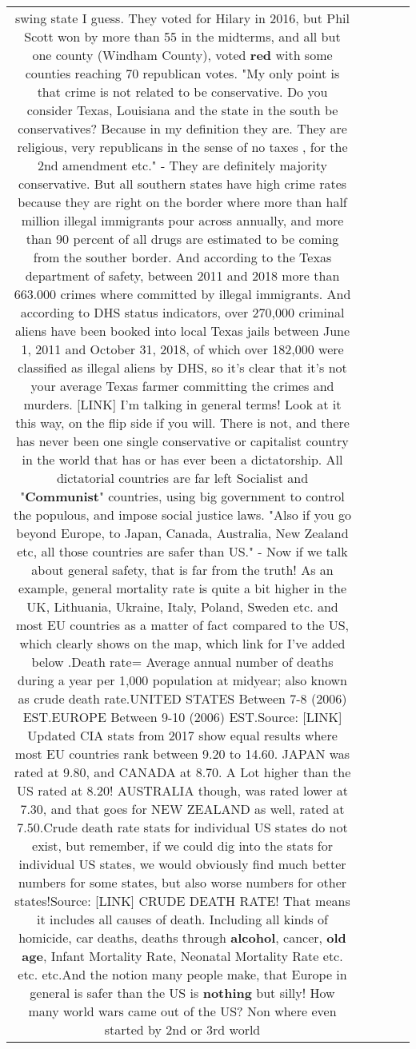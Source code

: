 \documentclass[11pt]{article}
\newlength\mylength
\begin{document}
\begin{center}
\begin{longtable}{|C{.65\mylength}|C{.30\mylength}|C{.12\mylength}|C{.12\mylength}|C{.12\mylength}|}
swing state I guess. They voted for Hilary in 2016, but Phil Scott won by more than 55 in the midterms, and all but one county (Windham County), voted \textbf{r\textbf{ed}} with some counties reaching 70 republican votes. "My only point is that crime is not related to be conservative. Do you consider Texas, Louisiana and the state in the south be conservatives? Because in my definition they are. They are religious, very republicans in the sense of no taxes , for the 2nd amendment etc." - They are definitely majority conservative. But all southern states have high crime rates because they are right on the border where more than half million illegal immigrants pour across annually, and more than 90 percent of all drugs are estimated to be coming from the souther border. And according to the Texas department of safety, between 2011 and 2018 more than 663.000 crimes where committed by illegal immigrants. And according to DHS status indicators, over 270,000 criminal aliens have been booked into local Texas jails between June 1, 2011 and October 31, 2018, of which over 182,000 were classified as illegal aliens by DHS, so it's clear that it's not your average Texas farmer committing the crimes and murders. [LINK] I'm talking in general terms! Look at it this way, on the flip side if you will. There is not, and there has never been one single conservative or capitalist country in the world that has or has ever been a dictatorship. All dictatorial countries are far left Socialist and "\textbf{Communist}" countries, using big government to control the populous, and impose social justice laws. "Also if you go beyond Europe, to Japan, Canada, Australia, New Zealand etc, all those countries are safer than US." - Now if we talk about general safety, that is far from the truth! As an example, general mortality rate is quite a bit higher in the UK, Lithuania, Ukraine, Italy, Poland, Sweden etc. and most EU countries as a matter of fact compared to the US, which clearly shows on the map, which link for I've added below .Death rate= Average annual number of deaths during a year per 1,000 population at midyear; also known as crude death rate.UNITED STATES     Between 7-8     (2006) EST.EUROPE       Between 9-10   (2006) EST.Source:   [LINK]  Updated CIA stats from 2017 show equal results where most EU countries rank between 9.20 to 14.60. JAPAN was rated at 9.80, and CANADA at 8.70. A Lot higher than the US rated at 8.20! AUSTRALIA though, was rated lower at 7.30, and that goes for NEW ZEALAND as well, rated at 7.50.Crude death rate stats for individual US states do not exist, but remember, if we could dig into the stats for individual US states, we would obviously find much better numbers for some states, but also worse numbers for other states!Source:  [LINK] CRUDE DEATH RATE! That means it includes all causes of death. Including all kinds of homicide, car deaths, deaths through \textbf{alcohol}, cancer, \textbf{old} \textbf{age}, Infant Mortality Rate, Neonatal Mortality Rate etc. etc. etc.And the notion many people make, that Europe in general is safer than the US is \textbf{nothing} but silly! How many world wars came out of the US? Non where even started by 2nd or 3rd world 
\end{longtable}
\end{center}
\end{document}
